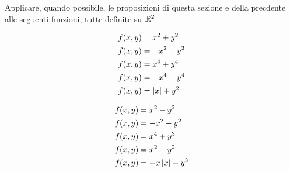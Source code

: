 \begin{exercise}
	Applicare, quando possibile, le proposizioni di questa sezione e della precdente alle seguenti funzioni, tutte definite su $\mathbb{R}^2$\\
	\begin{minipage}{0.49\linewidth}
		\begin{align*}
			f(x,y) &= x^2 + y^2\\
			f(x,y) &= -x^2 + y^2\\
			f(x,y) &= x^4 + y^4\\
			f(x,y) &= -x^4 - y^4\\
			f(x,y) &= \left|x\right| + y^2
		\end{align*}
	\end{minipage}
	\begin{minipage}{0.49\linewidth}
		\begin{align*}
			f(x,y) &= x^2 - y^2\\
			f(x,y) &= -x^2 - y^2\\
			f(x,y) &= x^4 + y^3\\
			f(x,y) &= x^2 - y^2\\
			f(x,y) &= -x \left|x\right| - y^3
		\end{align*}
	\end{minipage}
\end{exercise}

\newpage
